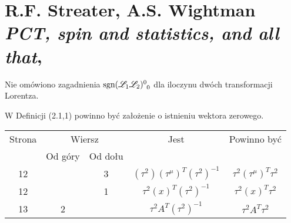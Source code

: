 \documentclass[a4paper,11pt]{article}
\numberwithin{equation}{section}
\begin{document}
\VerSpaceTwo













\newpage

\section{R.F. Streater, A.S. Wightman \\
  \textit{PCT, spin and statistics, and all that},
  \cite{StreaterWightmanPCT2000}}


\vspace{0em}



\vspace{0em}


\noindent
{}

\VerSpaceFour





\noindent
{} Nie omówiono zagadnienia
$\sgn\tensor{ ( \Lcal_{ 1 } \Lcal_{ 2 } ) }{^{ 0 }_{ 0 }}$ dla iloczynu dwóch
transformacji Lorentza.

\VerSpaceFour





\noindent
{} W Definicji (2.1,1) powinno być założenie o istnieniu
wektora zerowego.







\begin{center}

  \begin{tabular}{|c|c|c|c|c|}
    \hline
    Strona & \multicolumn{2}{c|}{Wiersz} & Jest
                              & Powinno być \\ \cline{2-3}
    & Od góry & Od dołu & & \\
    \hline
    12 & &  3 & $( \tau^{ 2 } )( \tau^{ \mu } )^{ T }( \tau^{ 2 } )^{ -1 }$
           & $\tau^{ 2 } ( \tau^{ \mu } )^{ T } \tau^{ 2 }$ \\
    12 & & 1 & $\tau^{ 2 } ( x )^{ T }( \tau^{ 2 } )^{ -1 }$
           & $\tau^{ 2 } ( x )^{ T } \tau^{ 2 }$ \\ %
    13 & 2 & & $\tau^{ 2 } A^{ T }( \tau^{ 2 } )^{ -1 }$
           & $\tau^{ 2 } A^{ T } \tau^{ 2 }$ \\
    \hline
  \end{tabular}

\end{center}
\end{document}
